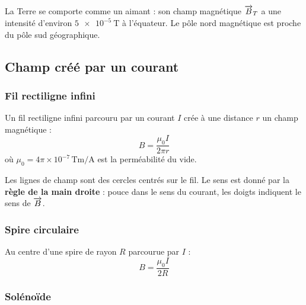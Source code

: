 \begin{propriete}
La Terre se comporte comme un aimant : son champ magnétique $\overrightarrow{B}_T$ a une intensité d’environ $\SI{5e-5}{\tesla}$ à l’équateur. Le pôle nord magnétique est proche du pôle sud géographique.
\end{propriete}

\subsection{Champ créé par un courant}

\subsubsection{Fil rectiligne infini}

\begin{loi}
Un fil rectiligne infini parcouru par un courant $I$ crée à une distance $r$ un champ magnétique :
\[
B = \frac{\mu_0 I}{2\pi r}
\]
où $\mu_0 = 4\pi\times10^{-7}\,\si{\tesla\metre\per\ampere}$ est la perméabilité du vide.
\end{loi}

\begin{remarque}
Les lignes de champ sont des cercles centrés sur le fil. Le sens est donné par la \textbf{règle de la main droite} : pouce dans le sens du courant, les doigts indiquent le sens de $\overrightarrow{B}$.
\end{remarque}

\begin{illus}
\end{illus}

\subsubsection{Spire circulaire}

Au centre d’une spire de rayon $R$ parcourue par $I$ :
\[
B = \frac{\mu_0 I}{2R}
\]

\subsubsection{Solénoïde}


